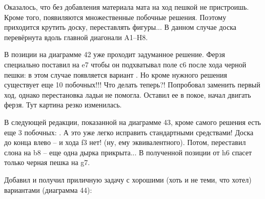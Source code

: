 \begin{multicols}{2}[]
\begin{center}
\begin{diagram}%
\end{diagram}%
\end{center}

Оказалось, что без добавления материала мата на ход пешкой не пристроишь. Кроме того, появиляются множественные побочные решения. Поэтому приходится крутить доску, переставлять фигуры... В данном случае доска перевёрнута вдоль главной диагонали A1--H8.

\begin{center}
\begin{diagram}%
\end{diagram}%
\end{center}

В позиции на диаграмме 42 уже проходит задуманное решение. Ферзя специально поставил на e7 чтобы он подхватывал поле с6 после хода черной пешки: в этом случае появляется вариант . Но кроме нужного решения существует еще 10 побочных!!! Что делать теперь?! Попробовал заменить первый ход, однако перестановка ладьи не помогла. Оставил ее в покое, начал двигать ферзя. Тут картина резко изменилась.

\begin{center}
\begin{diagram}%
\end{diagram}%
\end{center}

В следующей редакции, показанной на диаграмме 43, кроме самого решения есть еще 3 побочных: . А это уже легко исправить стандартными средствами! Доска до конца влево -- и хода \queen{}f3 нет! (ну, ему эквивалентного). Потом, переставил слона на b8 -- еще одна дырка прикрыта... В полученной позиции от \queen{}h6 спасет только черная пешка на g7.

Добавил и получил приличную задачу с хорошими (хоть и не теми, что хотел) вариантами (диаграмма 44):

\begin{center}
\begin{diagram}%
\end{diagram}%
\end{center}


\end{multicols}
